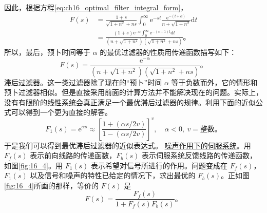因此，根据方程\eqref{eq:ch16_optimal_filter_integral_form}，
\begin{equation*}
\begin{aligned}
F(s) &= \frac{1+s}{\sqrt{1+n^2}+ns} \int_{0}^{\infty} \mathrm{e}^{-st} \frac{\mathrm{e}^{-(t+\alpha)}}{n+\sqrt{1+n^2}} \mathrm{d}t \\
&= \frac{(1+s)\mathrm{e}^{-\alpha} \int_{0}^{\infty} \mathrm{e}^{-(s+1)t} \mathrm{d}t}{(n+\sqrt{1+n^2})(\sqrt{1+n^2}+ns)}。
\end{aligned}
\end{equation*}
所以，最后，预卜时间等于 $\alpha$ 的最优过滤器的性质用传递函数描写如下：
\begin{equation}
F(s) = \frac{\mathrm{e}^{-\alpha}}{(n+\sqrt{1+n^2})(\sqrt{1+n^2}+ns)}。
\label{eq:ch16_5_predictive_filter_tf}
\end{equation}
\underline{滞后过滤器}。这一类过滤器除了现在的“预卜”时间 $\alpha$ 等于负数而外，它的情形和预卜过滤器相似。但是直接采用前面的计算方法并不能解决现在的问题。实际上，没有有限阶的线性系统会真正满足一个最优滞后过滤器的规律。利用下面的近似公式可以得到一个更为直接的解答。
\begin{equation}
F_1(s) = \mathrm{e}^{\alpha s} \approx \left[\frac{1+(\alpha s/2v)}{1-(\alpha s/2v)}\right]^v, \quad \alpha<0,\ v=\text{整数}。
\label{eq:ch16_5_lag_approx_formula}
\end{equation}
于是我们可以得到最优滞后过滤器的近似表达式。
\underline{噪声作用下的伺服系统}。用 $F_f(s)$ 表示前向线路的传递函数，$F_b(s)$ 表示伺服系统反馈线路的传递函数，如图\ref{fig:16_4}。用 $F_1(s)$ 表示希望对信号所进行的作用。问题变成在 $F_f(s)$，$F_1(s)$ 以及信号和噪声的特性已给定的情况下，求出最优的 $F_b(s)$。正如图\ref{fig:16_4}所画的那样，等价的 $F(s)$ 是
\begin{equation}
F(s) = \frac{F_f(s)}{1+F_f(s)F_b(s)}。
\label{eq:ch16_5_equivalent_filter_tf}
\end{equation}

